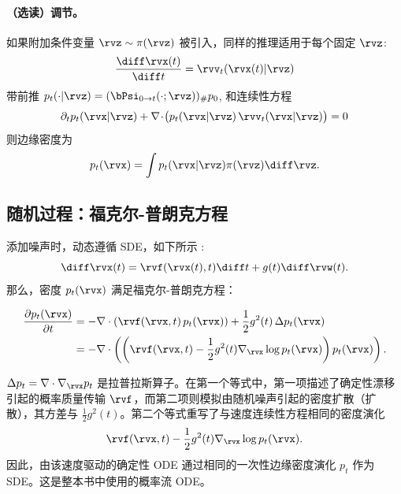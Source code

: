 \paragraph{（选读）调节。}
如果附加条件变量 $\rvz \sim \pi(\rvz)$ 被引入，同样的推理适用于每个固定 $\rvz$:
\[
\frac{\diff \rvx(t)}{\diff t}=\rvv_t(\rvx(t)|\rvz)
\]
带前推 $p_t(\cdot|\rvz)=(\bPsi_{0\to t}(\cdot;\rvz))_{\#}p_0$, 和连续性方程
\[
\partial_t p_t(\rvx|\rvz)+\nabla\!\cdot\!\big(p_t(\rvx|\rvz)\,\rvv_t(\rvx|\rvz)\big)=0
\]
则边缘密度为
\[
p_t(\rvx)=\int p_t(\rvx|\rvz)\pi(\rvz)\diff\rvz.
\]


\subsection{随机过程：福克尔-普朗克方程}\label{subsec:cov-fpe}

添加噪声时，动态遵循 SDE，如下所示 :
\[
\diff \rvx(t) = \rvf(\rvx(t), t)\diff t + g(t)\diff \rvw(t).
\]
那么，密度 $ p_t(\rvx) $ 满足福克尔-普朗克方程：
\begin{mdframed}
    \begin{align*}
    \frac{\partial p_t(\rvx)}{\partial t}
&= - \nabla \cdot \left( \rvf(\rvx, t)\, p_t(\rvx) \right)
+ \frac{1}{2} g^2(t)\, \Delta p_t(\rvx)
\\& = - \nabla \cdot \left(  \left({\rvf(\rvx, t)}-{\frac{1}{2} g^2(t) \nabla_\rvx \log p_t(\rvx)}\right) p_t(\rvx)\right).
\end{align*}
\end{mdframed}
$ \Delta p_t = \nabla \cdot \nabla_\rvx p_t $ 是拉普拉斯算子。在第一个等式中，第一项描述了确定性漂移引起的概率质量传输 $\rvf$，而第二项则模拟由随机噪声引起的密度扩散（扩散），其方差与 $\tfrac{1}{2} g^2(t) $。第二个等式重写了与速度连续性方程相同的密度演化
\[
\rvf(\rvx,t)
-
\frac{1}{2}g^2(t)\nabla_{\rvx}\log p_t(\rvx).
\]
因此，由该速度驱动的确定性 ODE 通过相同的一次性边缘密度演化
$p_t$ 作为 SDE。这是整本书中使用的概率流 ODE。



